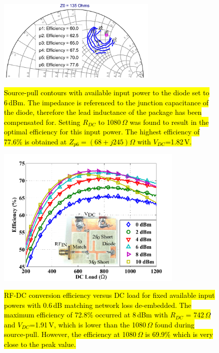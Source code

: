 \begin{figure}
  \begin{center}
  \includegraphics[width=3.0in]{pdf/06.pdf}\\
 \caption{\hl{Source-pull contours with available input power to the diode set to 6\,dBm.  The impedance is referenced to the junction capacitance of the diode, therefore the lead inductance of the package has been compensated for. Setting $R_{DC}$ to 1080\,$\Omega$ was found to result in the optimal efficiency for this input power. The highest efficiency of 77.6\% is obtained at $Z_{p6}=(68+j245)\Omega$ with $V_{DC}$=1.82\,V.}}\label{lpcontours}
  \end{center}
\end{figure}
 


\begin{figure}
  \begin{center}
  \includegraphics[width=3.5in]{pdf/07.pdf}\\
 \caption{\hl{RF-DC conversion efficiency versus DC load for fixed available input powers with 0.6\,dB matching network loss de-embedded.  The maximum efficiency of 72.8\% occurred at 8\,dBm with $R_{DC}$ = 742\,$\Omega$ and $V_{DC}$=1.91\,V, which is lower than the 1080\,$\Omega$ found during source-pull.  However, the efficiency at 1080\,$\Omega$ is 69.9\% which is very close to the peak value.}}\label{final_dc_sweep}
  \end{center}
\end{figure}
 

